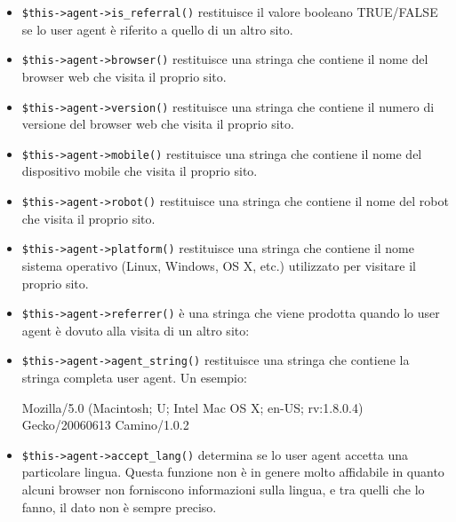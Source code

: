 \begin{itemize}
\item \verb|$this->agent->is_referral()| restituisce il valore booleano TRUE/FALSE se lo user agent è riferito a quello di un altro sito.

\item \verb|$this->agent->browser()| restituisce una stringa che contiene il nome del browser web che visita il proprio sito.

\item \verb|$this->agent->version()| restituisce una stringa che contiene il numero di versione del browser web che visita il proprio sito.

\item \verb|$this->agent->mobile()| restituisce una stringa che contiene il nome del dispositivo mobile che visita il proprio sito.

\item \verb|$this->agent->robot()| restituisce una stringa che contiene il nome del robot che visita il proprio sito.

\item \verb|$this->agent->platform()| restituisce una stringa che contiene il nome sistema operativo (Linux, Windows, OS X, etc.) utilizzato per visitare il proprio sito.

\item \verb|$this->agent->referrer()| è una stringa che viene prodotta quando lo user agent è dovuto alla visita di un altro sito:


\item \verb|$this->agent->agent_string()| restituisce una stringa che contiene la stringa completa user agent. Un esempio:

\begin{code}
Mozilla/5.0 (Macintosh; U; Intel Mac OS X; en-US; rv:1.8.0.4) Gecko/20060613 Camino/1.0.2
\end{code}

\item \verb|$this->agent->accept_lang()| determina se lo user agent accetta una particolare lingua. Questa funzione non è in genere molto affidabile in quanto alcuni browser non forniscono informazioni sulla lingua, e tra quelli che lo fanno, il dato non è sempre preciso.



\end{itemize}

